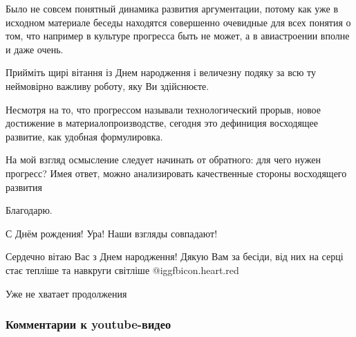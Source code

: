 \begin{itemize}
Было не совсем понятный динамика развития аргументации, потому как уже в
исходном материале беседы находятся совершенно очевидные для всех понятия о
том, что например в культуре прогресса быть не может, а в авиастроении вполне и
даже очень.


Прийміть щирі вітання із Днем народження і величезну подяку за всю ту
неймовірно важливу роботу, яку Ви здійснюєте.


Несмотря на то, что прогрессом называли технологический прорыв, новое
достижение в материалопроизводстве, сегодня это дефиниция восходящее развитие,
как удобная формулировка.

На мой взгляд осмысление следует начинать от обратного: для чего нужен
прогресс? Имея ответ, можно анализировать качественные стороны восходящего
развития

Благодарю.

С Днём рождения! Ура! Наши взгляды совпадают!

Сердечно вітаю Вас з Днем народження! Дякую Вам за бесіди, від них на серці стає тепліше та навкруги світліше 
@igg{fbicon.heart.red}

Уже не хватает продолжения

\end{itemize} %

\subsubsection{Комментарии к youtube-видео}

